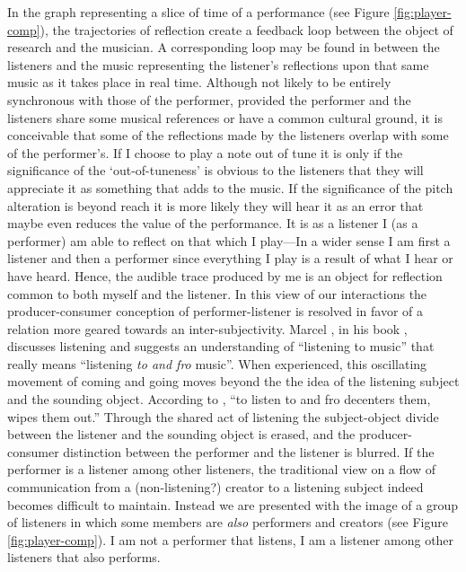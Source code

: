 In the graph representing a slice of time of a performance (see Figure \ref{fig:player-comp}), the trajectories of reflection create a feedback loop between the object of research and the musician. A corresponding loop may be found in between the listeners and the music representing the listener's reflections upon that same music as it takes place in real time. Although not likely to be entirely synchronous with those of the performer, provided the performer and the listeners share some musical references or have a common cultural ground, it is conceivable that some of the reflections made by the listeners overlap with some of the performer's. If I choose to play a note out of tune it is only if the significance of the `out-of-tuneness' is obvious to the listeners that they will appreciate it as something that adds to the music. If the significance of the pitch alteration is beyond reach it is more likely they will hear it as an error that maybe even reduces the value of the performance. It is as a listener I (as a performer) am able to reflect on that which I play---In a wider sense I am first a listener and then a performer since everything I play is a result of what I hear or have heard. Hence, the audible trace produced by me is an object for reflection common to both myself and the listener. In this view of our interactions the producer-consumer conception of performer-listener is resolved in favor of a relation more geared towards an  inter-subjectivity. Marcel \citeauthor{cobussen08}, in his book , discusses listening and suggests an understanding of ``listening to music'' that really means ``listening \emph{to and fro} music''. \parencite[p. 135 (italics by the author)]{cobussen08} When experienced, this oscillating movement of coming and going moves beyond the the idea of the listening subject and the sounding object. According to \citeauthor{cobussen08}, ``to listen to and fro decenters them, wipes them out.'' \parencite[135]{cobussen08} Through the shared act of listening the subject-object divide between the listener and the sounding object is erased, and the producer-consumer distinction between the performer and the listener is blurred. 
If the performer is a listener among other listeners, the traditional view on a flow of communication from a (non-listening?) creator to a listening subject indeed becomes difficult to maintain. Instead we are presented with the image of a group of listeners in which some members are \emph{also} performers and creators (see Figure \ref{fig:player-comp}). I am not a performer that listens, I am a listener among other listeners that also performs. 

